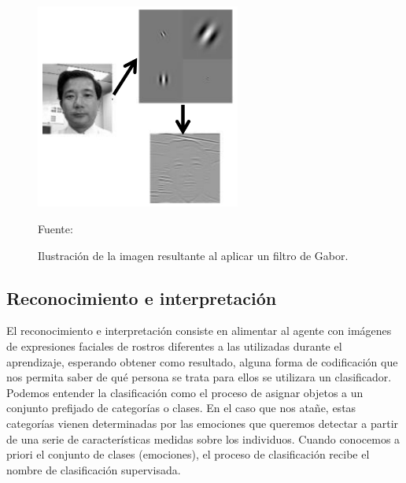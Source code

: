 \begin{enumerate}
\begin{figure}[ht]
\begin{center}
\includegraphics[width=0.6\textwidth]{Imagen24}
\end{center}
\begin{center}
\vskip -0.5cm
\caption{\small{Ilustración de la imagen resultante al aplicar un filtro de Gabor.}}
{\small{Fuente: \cite{FALTA}}}
\end{center}
\end{figure}

\end{enumerate}

\subsection{Reconocimiento e interpretación}

El reconocimiento e interpretación consiste en alimentar al agente con imágenes de expresiones faciales de rostros diferentes a las utilizadas durante el aprendizaje, esperando obtener como resultado, alguna forma de codificación que nos permita saber de qué persona se trata para ellos se utilizara un clasificador.
\vskip 0.1cm
Podemos entender la clasificación como el proceso de asignar objetos a un conjunto prefijado de categorías o clases. En el caso que nos atañe, estas categorías vienen determinadas por las emociones que queremos detectar a partir de una serie de características medidas sobre los individuos. Cuando conocemos a priori el conjunto de clases (emociones), el proceso de clasificación recibe el nombre de clasificación supervisada.

